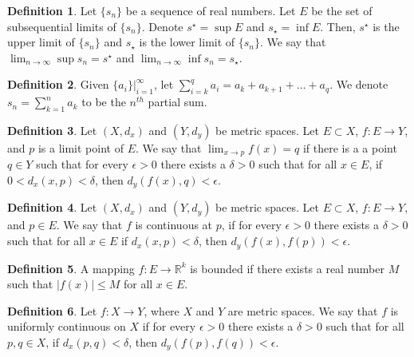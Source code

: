 \documentclass[12pt]{article}
\theoremstyle{definition}
\newtheorem{definition}{Definition}
\theoremstyle{named}
\begin{document}
\renewcommand{\thedefinition}{3.16}
\begin{definition}
    Let $\{s_n\}$ be a sequence of real numbers. Let $E$ be the set of subsequential limits of $\{s_n\}$. Denote $s^\star = \sup E$ and $s_\star = \inf E$. Then, $s^\star$ is the upper limit of $\{s_n\}$ and $s_\star$ is the lower limit of $\{s_n\}$. We say that $\lim_{n \to \infty} \sup s_n = s^\star$ and $\lim_{n \to \infty} \inf s_n = s_\star$. 
\end{definition}

\renewcommand{\thedefinition}{3.21}
\begin{definition}
    Given $\{a_i\} \biggr\rvert_{i=1}^{\infty}$, let $\sum_{i=k}^{q} a_i = a_k + a_{k+1} + \dots + a_q$. We denote $s_n = \sum_{k=1}^{n} a_k$ to be the $n^{th}$ partial sum. 
\end{definition}

\renewcommand{\thedefinition}{4.1}
\begin{definition}
    Let $(X,d_x)$ and $(Y,d_y)$ be metric spaces. Let $E \subset X$, $f: E \to Y$, and $p$ is a limit point of $E$. We say that $\lim_{x \to p} f(x) = q$ if there is a a point $q \in Y$ such that for every $\epsilon > 0$ there exists a $\delta > 0$ such that for all $x \in E$, if $0 < d_x(x,p) < \delta$, then $d_y(f(x), q) < \epsilon$. 
\end{definition}

\renewcommand{\thedefinition}{4.5}
\begin{definition}
    Let $(X, d_x)$ and $(Y, d_y)$ be metric spaces. Let $E \subset X$, $f: E \to Y$, and $p \in E$. We say that $f$ is continuous at $p$, if for every $\epsilon > 0$ there exists a $\delta > 0$ such that for all $x \in E$ if $d_x(x,p) < \delta$, then $d_y(f(x), f(p)) < \epsilon$. 
\end{definition}

\renewcommand{\thedefinition}{4.13}
\begin{definition}
    A mapping $f: E \to \mathbb{R}^k$ is bounded if there exists a real number $M$ such that $\left|f(x)\right| \leq M$ for all $x \in E$. 
\end{definition}

\renewcommand{\thedefinition}{4.18}
\begin{definition}
    Let $f: X \to Y$, where $X$ and $Y$ are metric spaces. We say that $f$ is uniformly continuous on $X$ if for every $\epsilon > 0$ there exists a $\delta > 0$ such that for all $p,q \in X$, if $d_x(p,q) < \delta$, then $d_y(f(p), f(q)) < \epsilon$. 
\end{definition}
\end{document}
